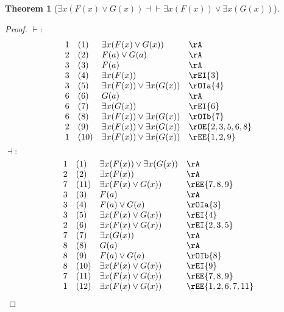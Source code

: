 \documentclass{book}
\theoremstyle{plain}
\newtheorem{theorem}{Theorem}
\theoremstyle{remark}
\theoremstyle{definition}
\begin{document}
\label{ExxLpFLpxRpOrGLpxRpRpEqvExxLpFLpxRpRpOrExxLpGLpxRpRp}
\begin{theorem}[\(\exists x(F(x)\lor G(x))\dashv\vdash \exists x(F(x))\lor \exists x(G(x))\)]
\end{theorem}
\begin{proof}
	\(\vdash:\)
	\[
	\begin{array}{llll}
		1 & (1) & \exists x(F(x)\lor G(x)) & \rA \\
		2 & (2) & F(a)\lor G(a) & \rA \\
		3 & (3) & F(a) & \rA \\	
		3 & (4) & \exists x(F(x)) & \rEI{3} \\	
		3 & (5) & \exists x(F(x))\lor \exists x(G(x)) & \rOIa{4} \\
		6 & (6) & G(a) & \rA \\
		6 & (7) & \exists x(G(x)) & \rEI{6} \\
		6 & (8) & \exists x(F(x))\lor \exists x(G(x)) & \rOIb{7} \\
		2 & (9) & \exists x(F(x))\lor \exists x(G(x)) & \rOE{2,3,5,6,8} \\
		1 & (10) & \exists x(F(x))\lor \exists x(G(x)) & \rEE{1,2,9} \\
	\end{array}
	\]
	\(\dashv:\)
	\[
	\begin{array}{llll}
		1 & (1) & \exists x(F(x))\lor \exists x(G(x)) & \rA \\
		2 & (2) & \exists x(F(x)) & \rA \\		7 & (11) & \exists x(F(x)\lor G(x)) & \rEE{7,8,9} \\
		3 & (3) & F(a) & \rA \\
		3 & (4) & F(a)\lor G(a) & \rOIa{3} \\
		3 & (5) & \exists x(F(x)\lor G(x)) & \rEI{4} \\
		2 & (6) & \exists x(F(x)\lor G(x)) & \rEI{2,3,5} \\
		7 & (7) & \exists x(G(x)) & \rA \\
		8 & (8) & G(a) & \rA \\
		8 & (9) & F(a)\lor G(a) & \rOIb{8} \\
		8 & (10) & \exists x(F(x)\lor G(x)) & \rEI{9} \\
		7 & (11) & \exists x(F(x)\lor G(x)) & \rEE{7,8,9} \\
		1 & (12) & \exists x(F(x)\lor G(x)) & \rEE{1,2,6,7,11} \\
	\end{array}
	\]
\end{proof}
\end{document}
